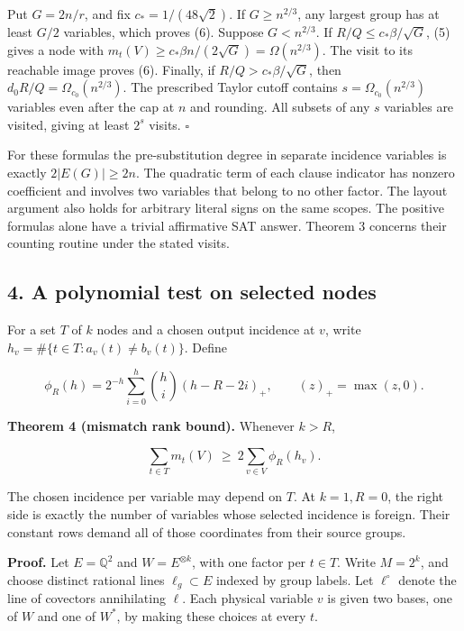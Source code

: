 \documentclass[
  10pt,
]{article}
\begin{document}
Put \(G=2n/r\), and fix \(c_*=1/(48\sqrt2)\). If \(G\ge n^{2/3}\), any
largest group has at least \(G/2\) variables, which proves (6). Suppose
\(G<n^{2/3}\). If \(R/Q\le c_*\beta/\sqrt G\), (5) gives a node with
\(m_t(V)\ge c_*\beta n/(2\sqrt G)=\Omega(n^{2/3})\). The visit to its
reachable image proves (6). Finally, if \(R/Q>c_*\beta/\sqrt G\), then
\(d_0R/Q=\Omega_{c_0}(n^{2/3})\). The prescribed Taylor cutoff contains
\(s=\Omega_{c_0}(n^{2/3})\) variables even after the cap at \(n\) and
rounding. All subsets of any \(s\) variables are visited, giving at
least \(2^s\) visits. \(\square\)

For these formulas the pre-substitution degree in separate incidence
variables is exactly \(2|E(G)|\ge2n\). The quadratic term of each clause
indicator has nonzero coefficient and involves two variables that belong
to no other factor. The layout argument also holds for arbitrary literal
signs on the same scopes. The positive formulas alone have a trivial
affirmative SAT answer. Theorem 3 concerns their counting routine under
the stated visits.

\subsection{4. A polynomial test on selected
nodes}\label{a-polynomial-test-on-selected-nodes}

For a set \(T\) of \(k\) nodes and a chosen output incidence at \(v\),
write \(h_v=\#\{t\in T:a_v(t)\ne b_v(t)\}\). Define

\[
 \phi_R(h)=2^{-h}\sum_{i=0}^h\binom hi(h-R-2i)_+,\qquad
 (z)_+=\max(z,0).
\]

\textbf{Theorem 4 (mismatch rank bound).} Whenever \(k>R\),

\[
                 \sum_{t\in T}m_t(V)\ \ge\ 2\sum_{v\in V}\phi_R(h_v).
                                                                         \tag{7}
\]

The chosen incidence per variable may depend on \(T\). At \(k=1,R=0\),
the right side is exactly the number of variables whose selected
incidence is foreign. Their constant rows demand all of those
coordinates from their source groups.

\textbf{Proof.} Let \(E=\mathbb Q^2\) and \(W=E^{\otimes k}\), with one
factor per \(t\in T\). Write \(M=2^k\), and choose distinct rational
lines \(\ell_g\subset E\) indexed by group labels. Let \(\ell^\circ\)
denote the line of covectors annihilating \(\ell\). Each physical
variable \(v\) is given two bases, one of \(W\) and one of \(W^*\), by
making these choices at every \(t\).
\end{document}
